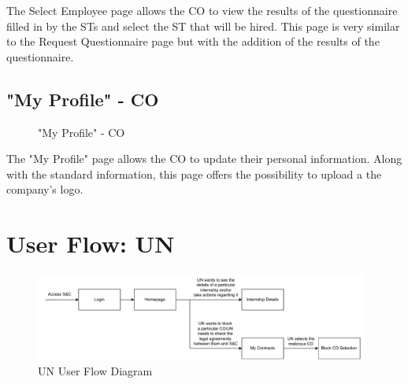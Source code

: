 \par The Select Employee page allows the CO to view the results of the questionnaire filled in by the STs and select
the ST that will be hired. This page is very similar to the Request Questionnaire page but with the addition of the
results of the questionnaire.

\subsection{"My Profile" - CO}
\label{subsec:profile-co}%

\begin{figure}[H]
    \centering
    \caption{"My Profile" - CO}
    \label{fig:my-profile-co}
\end{figure}

\par The "My Profile" page allows the CO to update their personal information. Along with the standard information,
this page offers the possibility to upload a the company's logo.

\section{User Flow: UN}
\label{sec:user-flow-un}%

\begin{figure}[H]
    \centering
    \includegraphics[width=0.98\textwidth]{Images/GUI/UN/Diagram.pdf}
    \caption{UN User Flow Diagram}
    \label{fig:un-user-flow-diagram}
\end{figure}

